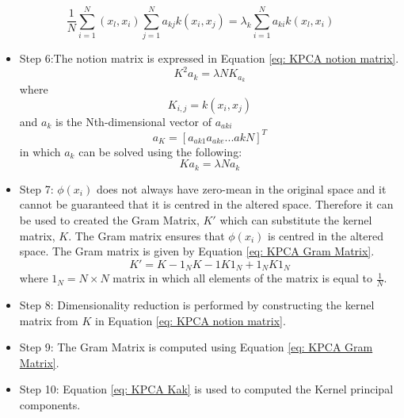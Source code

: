 \documentclass[11pt,twocolumn]{witseiepaper}
\begin{document}
	\begin{equation}
	\label{eq: KPCA multiplied}
	\frac{1}{N}\sum_{i=1}^{N}(x_l, x_i)\sum_{j=1}^{N}a_{kj}k(x_i, x_j) = \lambda_k\sum_{i=1}^{N}a_{ki}k(x_l, x_i)
	\end{equation}
	\begin{itemize}
		\item Step 6:The notion matrix is expressed in Equation \ref{eq: KPCA notion matrix}.
		\begin{equation}
			\label{eq: KPCA notion matrix}
			K^2a_k = \lambda N K_{a_k} 
		\end{equation}
		where 
		\begin{equation}
			K_{i,j} = k(x_i, x_j)
		\end{equation}
		and $a_k$ is the Nth-dimensional vector of $a_{aki}$
		\begin{equation}
			a_{K} = [a_{ak1}a_{ake} . . . akN]^T
		\end{equation}
		in which $a_k$ can be solved using the following:
		\begin{equation}
			\label{eq: KPCA Kak}
			Ka_k = \lambda N a_k
		\end{equation} 
		\item Step 7: $\phi(x_i)$ does not always have zero-mean in the original space and it cannot be guaranteed that it is centred in the altered space. Therefore it can be used to created the Gram Matrix, $K'$ which can substitute the kernel matrix, $K$. The Gram matrix ensures that $\phi(x_i)$ is centred in the altered space. The Gram matrix is given by Equation \ref{eq: KPCA Gram Matrix}.
		\begin{equation}
			\label{eq: KPCA Gram Matrix}
			K' = K - 1_N K - 1K1_N + 1_NK1_N
		\end{equation}
		where $1_N = N \times N$ matrix in which all elements of the matrix is equal to $\frac{1}{N}$.\\
		\item Step 8: Dimensionality reduction is performed by constructing the kernel matrix from $K$ in Equation \ref{eq: KPCA notion matrix}. \\
		\item Step 9: The Gram Matrix is computed using Equation \ref{eq: KPCA Gram Matrix}. \\
		\item Step 10: Equation \ref{eq: KPCA Kak} is used to computed the Kernel principal components.
	\end{itemize}
\end{document}
